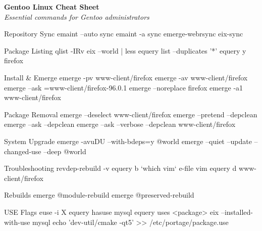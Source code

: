 \documentclass[10pt]{article}
\begin{document}
\pagestyle{empty}
\begin{center}
	{\Huge\textbf{Gentoo Linux Cheat Sheet}}\\
	\vspace{5pt}
	{\small\textit{Essential commands for Gentoo administrators}}
\end{center}

\begin{multicols}{2}

\begin{cheatbox}{Repository Sync}
emaint --auto sync
emaint -a sync
emerge-webrsync
eix-sync
\end{cheatbox}

\begin{cheatbox}{Package Listing}
qlist -IRv
eix --world | less
equery list --duplicates '*'
equery y firefox
\end{cheatbox}

\begin{cheatbox}{Install \& Emerge}
emerge -pv www-client/firefox
emerge -av www-client/firefox
emerge --ask =www-client/firefox-96.0.1
emerge --noreplace firefox
emerge -a1 www-client/firefox
\end{cheatbox}

\begin{cheatbox}{Package Removal}
emerge --deselect www-client/firefox
emerge --pretend --depclean
emerge --ask --depclean
emerge --ask --verbose --depclean www-client/firefox
\end{cheatbox}

\begin{cheatbox}{System Upgrade}
emerge -avuDU --with-bdeps=y @world
emerge --quiet --update --changed-use --deep @world
\end{cheatbox}

\begin{cheatbox}{Troubleshooting}
revdep-rebuild -v
equery b `which vim`
e-file vim
equery d www-client/firefox
\end{cheatbox}

\begin{cheatbox}{Rebuilds}
emerge @module-rebuild
emerge @preserved-rebuild
\end{cheatbox}

\begin{cheatbox}{USE Flags}
euse -i X
equery hasuse mysql
equery uses <package>
eix --installed-with-use mysql
echo 'dev-util/cmake -qt5' >> /etc/portage/package.use
\end{cheatbox}


\end{multicols}
\end{document}
